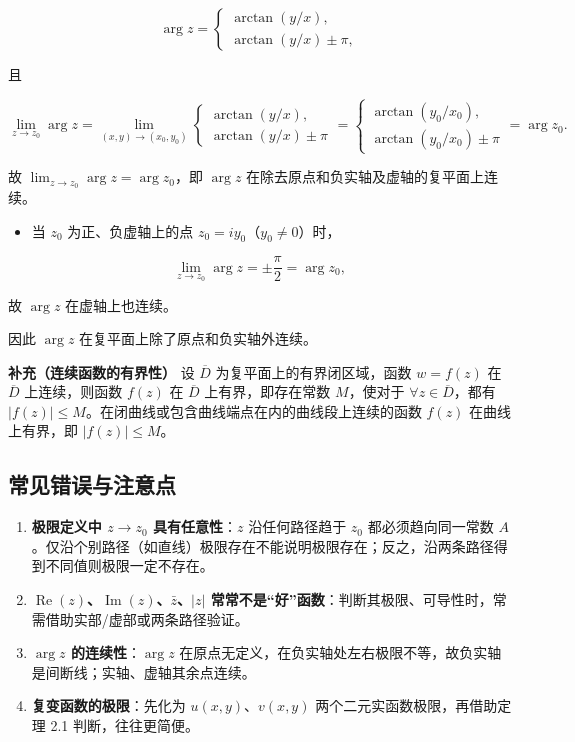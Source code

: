 \[
\arg z=
\begin{cases}
\arctan(y/x),\\
\arctan(y/x)\pm\pi,
\end{cases}
\]

且

\[
\lim_{z\to z_0}\arg z
=\lim_{(x,y)\to(x_0,y_0)}
\begin{cases}
\arctan(y/x),\\
\arctan(y/x)\pm\pi
\end{cases}
=
\begin{cases}
\arctan(y_0/x_0),\\
\arctan(y_0/x_0)\pm\pi
\end{cases}
=\arg z_0 .
\]

故 \(\lim_{z\to z_0}\arg z=\arg z_0\)，即 \(\arg z\)
在除去原点和负实轴及虚轴的复平面上连续。

\begin{itemize}
\tightlist
\item
  当 \(z_0\) 为正、负虚轴上的点 \(z_0=iy_0\)（\(y_0\neq 0\)）时，
\end{itemize}

\[
\lim_{z\to z_0}\arg z=\pm\frac{\pi}{2}=\arg z_0,
\]

故 \(\arg z\) 在虚轴上也连续。

因此 \(\arg z\) 在复平面上除了原点和负实轴外连续。

\textbf{补充（连续函数的有界性）} 设 \(\overline D\)
为复平面上的有界闭区域，函数 \(w=f(z)\) 在 \(\overline D\)
上连续，则函数 \(f(z)\) 在 \(\overline D\) 上有界，即存在常数
\(M\)，使对于 \(\forall z\in\overline D\)，都有
\(|f(z)|\le M\)。在闭曲线或包含曲线端点在内的曲线段上连续的函数 \(f(z)\)
在曲线上有界，即 \(|f(z)|\le M\)。

\subsection{常见错误与注意点}\label{ux5e38ux89c1ux9519ux8befux4e0eux6ce8ux610fux70b9-3}

\begin{enumerate}
\def\labelenumi{\arabic{enumi}.}
\tightlist
\item
  \textbf{极限定义中 \(z\to z_0\) 具有任意性}：\(z\) 沿任何路径趋于
  \(z_0\) 都必须趋向同一常数
  \(A\)。仅沿个别路径（如直线）极限存在不能说明极限存在；反之，沿两条路径得到不同值则极限一定不存在。
\item
  \textbf{\(\operatorname{Re}(z)\)、\(\operatorname{Im}(z)\)、\(\bar z\)、\(|z|\)
  常常不是``好''函数}：判断其极限、可导性时，常需借助实部/虚部或两条路径验证。
\item
  \textbf{\(\arg z\) 的连续性}：\(\arg z\)
  在原点无定义，在负实轴处左右极限不等，故负实轴是间断线；实轴、虚轴其余点连续。
\item
  \textbf{复变函数的极限}：先化为 \(u(x,y)\)、\(v(x,y)\)
  两个二元实函数极限，再借助定理 2.1 判断，往往更简便。
\end{enumerate}

